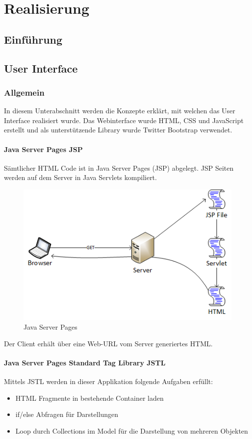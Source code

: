 \chapter{Realisierung}
\section{Einführung}





\section{User Interface}
\subsection{Allgemein}
In diesem Unterabschnitt werden die Konzepte erklärt, mit welchen das User Interface realisiert wurde. Das Webinterface wurde HTML, CSS und JavaScript erstellt und als unterstützende Library wurde Twitter Bootstrap verwendet.

\subsubsection{Java Server Pages JSP}
Sämtlicher HTML Code ist in Java Server Pages (JSP) abgelegt. JSP Seiten werden auf dem Server in Java Servlets kompiliert.
\begin{figure}[H]
\centering
\includegraphics[scale=1]{../04_Realisierung/images/userinterface/jsp.png}
\caption{Java Server Pages}
\end{figure}
Der Client erhält über eine Web-URL vom Server generiertes HTML.

\subsubsection{Java Server Pages Standard Tag Library JSTL}
Mittels JSTL werden in dieser Applikation folgende Aufgaben erfüllt:
\begin{itemize}
\item HTML Fragmente in bestehende Container laden
\item if/else Abfragen für Darstellungen
\item Loop durch Collections im Model für die Darstellung von mehreren Objekten
\end{itemize}

